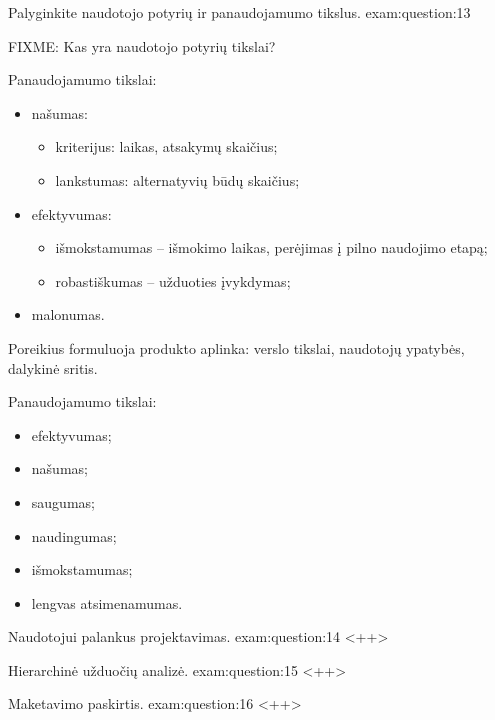 \begin{question}{%
  Palyginkite naudotojo potyrių ir panaudojamumo tikslus.
  }{exam:question:13}

  FIXME: Kas yra naudotojo potyrių tikslai?

  Panaudojamumo tikslai\cite[20--]{skaidres-5}:
  \begin{itemize}
    \item našumas:
      \begin{itemize}
        \item kriterijus: laikas, atsakymų skaičius;
        \item lankstumas: alternatyvių būdų skaičius;
      \end{itemize}
    \item efektyvumas:
      \begin{itemize}
        \item išmokstamumas – išmokimo laikas, perėjimas į pilno naudojimo
          etapą;
        \item robastiškumas – užduoties įvykdymas;
      \end{itemize}
    \item malonumas.
  \end{itemize}
  Poreikius formuluoja produkto aplinka: verslo tikslai, naudotojų ypatybės,
  dalykinė sritis.

  Panaudojamumo tikslai\cite[47p.]{konspektas}:
  \begin{itemize}
    \item efektyvumas;
    \item našumas;
    \item saugumas;
    \item naudingumas;
    \item išmokstamumas;
    \item lengvas atsimenamumas.
  \end{itemize}
\end{question}

\begin{question}{%
  Naudotojui palankus projektavimas.
  }{exam:question:14}
  <++>
\end{question}

\begin{question}{%
  Hierarchinė užduočių analizė.
  }{exam:question:15}
  <++>
\end{question}

\begin{question}{%
  Maketavimo paskirtis.
  }{exam:question:16}
  <++>
\end{question}

